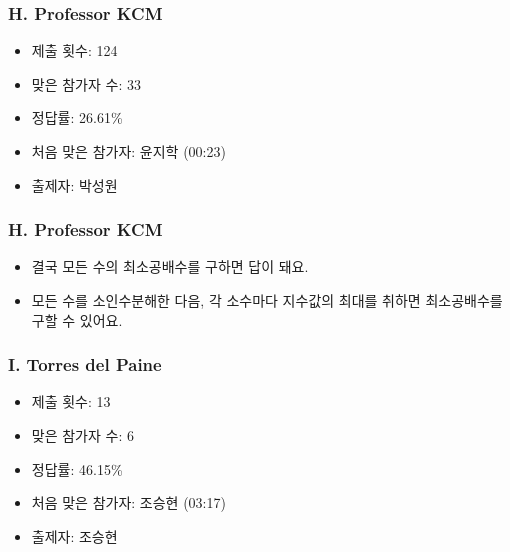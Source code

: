 \documentclass[xetex]{beamer}
\begin{document}
\begin{frame}
  \frametitle{H. Professor KCM}
  \begin{itemize}
    \item 제출 횟수: 124
    \item 맞은 참가자 수: 33
    \item 정답률: 26.61\%
    \item 처음 맞은 참가자: 윤지학 (00:23)
    \item 출제자: 박성원
  \end{itemize}
\end{frame}

\begin{frame}
  \frametitle{H. Professor KCM}
  \begin{itemize}
    \item 결국 모든 수의 최소공배수를 구하면 답이 돼요.
    \item 모든 수를 소인수분해한 다음, 각 소수마다 지수값의 최대를 취하면 최소공배수를 구할 수 있어요.
  \end{itemize}
\end{frame}

\begin{frame}
  \frametitle{I. Torres del Paine}
  \begin{itemize}
    \item 제출 횟수: 13
    \item 맞은 참가자 수: 6
    \item 정답률: 46.15\%
    \item 처음 맞은 참가자: 조승현 (03:17)
    \item 출제자: 조승현
  \end{itemize}
\end{frame}
\end{document}
